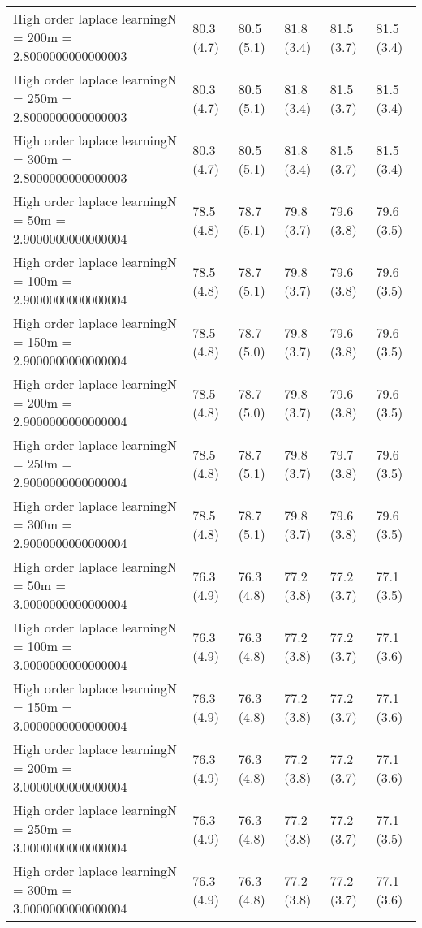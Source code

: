 \documentclass{article}
\begin{document}
\begin{table*}[t!]
\begin{center}
\begin{small}
\begin{sc}
\begin{tabular}{llllll}
High order laplace learningN = 200m = 2.8000000000000003&80.3 (4.7)      &80.5 (5.1)      &81.8 (3.4)      &81.5 (3.7)      &81.5 (3.4)      \\
High order laplace learningN = 250m = 2.8000000000000003&80.3 (4.7)      &80.5 (5.1)      &81.8 (3.4)      &81.5 (3.7)      &81.5 (3.4)      \\
High order laplace learningN = 300m = 2.8000000000000003&80.3 (4.7)      &80.5 (5.1)      &81.8 (3.4)      &81.5 (3.7)      &81.5 (3.4)      \\
High order laplace learningN = 50m = 2.9000000000000004&78.5 (4.8)      &78.7 (5.1)      &79.8 (3.7)      &79.6 (3.8)      &79.6 (3.5)      \\
High order laplace learningN = 100m = 2.9000000000000004&78.5 (4.8)      &78.7 (5.1)      &79.8 (3.7)      &79.6 (3.8)      &79.6 (3.5)      \\
High order laplace learningN = 150m = 2.9000000000000004&78.5 (4.8)      &78.7 (5.0)      &79.8 (3.7)      &79.6 (3.8)      &79.6 (3.5)      \\
High order laplace learningN = 200m = 2.9000000000000004&78.5 (4.8)      &78.7 (5.0)      &79.8 (3.7)      &79.6 (3.8)      &79.6 (3.5)      \\
High order laplace learningN = 250m = 2.9000000000000004&78.5 (4.8)      &78.7 (5.1)      &79.8 (3.7)      &79.7 (3.8)      &79.6 (3.5)      \\
High order laplace learningN = 300m = 2.9000000000000004&78.5 (4.8)      &78.7 (5.1)      &79.8 (3.7)      &79.6 (3.8)      &79.6 (3.5)      \\
High order laplace learningN = 50m = 3.0000000000000004&76.3 (4.9)      &76.3 (4.8)      &77.2 (3.8)      &77.2 (3.7)      &77.1 (3.5)      \\
High order laplace learningN = 100m = 3.0000000000000004&76.3 (4.9)      &76.3 (4.8)      &77.2 (3.8)      &77.2 (3.7)      &77.1 (3.6)      \\
High order laplace learningN = 150m = 3.0000000000000004&76.3 (4.9)      &76.3 (4.8)      &77.2 (3.8)      &77.2 (3.7)      &77.1 (3.6)      \\
High order laplace learningN = 200m = 3.0000000000000004&76.3 (4.9)      &76.3 (4.8)      &77.2 (3.8)      &77.2 (3.7)      &77.1 (3.6)      \\
High order laplace learningN = 250m = 3.0000000000000004&76.3 (4.9)      &76.3 (4.8)      &77.2 (3.8)      &77.2 (3.7)      &77.1 (3.5)      \\
High order laplace learningN = 300m = 3.0000000000000004&76.3 (4.9)      &76.3 (4.8)      &77.2 (3.8)      &77.2 (3.7)      &77.1 (3.6)      \\

\end{tabular}
\end{sc}
\end{small}
\end{center}
\end{table*}
\end{document}
